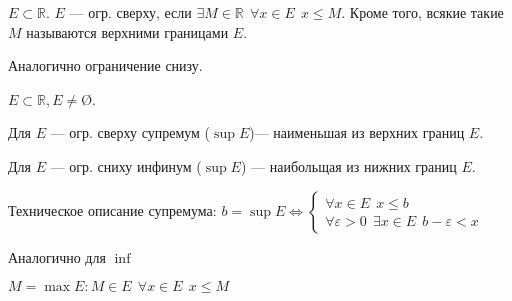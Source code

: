 \begin{definition}
$E\subset \mathbb{R}$. $E$ --- огр. сверху, если $\exists M\in\mathbb{R} \ \ \forall x\in E \ \ x\leq M$. Кроме того, всякие такие $M$ называются верхними границами $E$.
\end{definition}

Аналогично ограничение снизу.

\begin{definition}
$E\subset \mathbb{R}, E\not=$\O.

Для $E$ --- огр. сверху супремум ($\sup E$)--- наименьшая из верхних границ $E$.

Для $E$ --- огр. сниху инфинум ($\sup E$) --- наибольщая из нижних границ $E$.
\end{definition}

\begin{remark}
Техническое описание супремума:
$b=\sup E \Leftrightarrow \begin{cases}
    \forall x\in E \ \ x\leq b \\
    \forall \varepsilon > 0 \ \ \exists x\in E \ \ b-\varepsilon<x
\end{cases}$
\end{remark}

Аналогично для $\inf$

\begin{definition}
$M=\max E : M\in E \ \ \forall x\in E \ \ x\leq M$
\end{definition}

